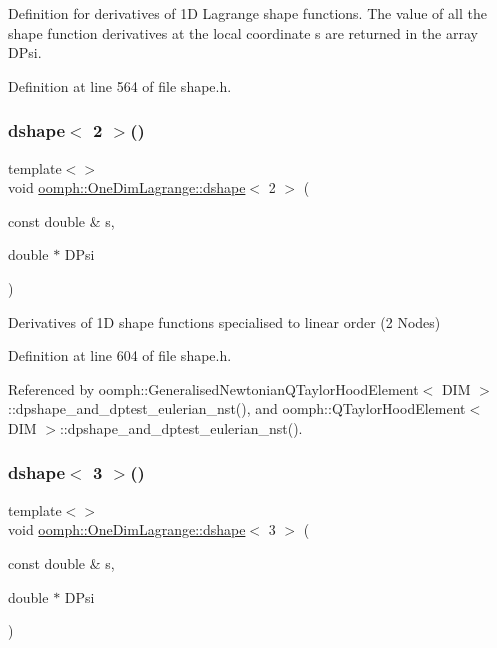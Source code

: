 Definition for derivatives of 1D Lagrange shape functions. The value of all the shape function derivatives at the local coordinate s are returned in the array D\+Psi. 



Definition at line 564 of file shape.\+h.

\mbox{\label{namespaceoomph_1_1OneDimLagrange_a956411abc42594a039c368e4ef69f48e}} 
\subsubsection{\texorpdfstring{dshape$<$ 2 $>$()}{dshape< 2 >()}}
{\footnotesize\ttfamily template$<$$>$ \\
void \hyperlink{namespaceoomph_1_1OneDimLagrange_af66e48b956c460371ac77032c1efcd72}{oomph\+::\+One\+Dim\+Lagrange\+::dshape}$<$ 2 $>$ (\begin{DoxyParamCaption}\item[{const double \&}]{s,  }\item[{double $\ast$}]{D\+Psi }\end{DoxyParamCaption})\hspace{0.3cm}{\ttfamily [inline]}}



Derivatives of 1D shape functions specialised to linear order (2 Nodes) 



Definition at line 604 of file shape.\+h.



Referenced by oomph\+::\+Generalised\+Newtonian\+Q\+Taylor\+Hood\+Element$<$ D\+I\+M $>$\+::dpshape\+\_\+and\+\_\+dptest\+\_\+eulerian\+\_\+nst(), and oomph\+::\+Q\+Taylor\+Hood\+Element$<$ D\+I\+M $>$\+::dpshape\+\_\+and\+\_\+dptest\+\_\+eulerian\+\_\+nst().

\mbox{\label{namespaceoomph_1_1OneDimLagrange_a5c1810613afa59bde79eecb02996caa3}} 
\subsubsection{\texorpdfstring{dshape$<$ 3 $>$()}{dshape< 3 >()}}
{\footnotesize\ttfamily template$<$$>$ \\
void \hyperlink{namespaceoomph_1_1OneDimLagrange_af66e48b956c460371ac77032c1efcd72}{oomph\+::\+One\+Dim\+Lagrange\+::dshape}$<$ 3 $>$ (\begin{DoxyParamCaption}\item[{const double \&}]{s,  }\item[{double $\ast$}]{D\+Psi }\end{DoxyParamCaption})\hspace{0.3cm}{\ttfamily [inline]}}



